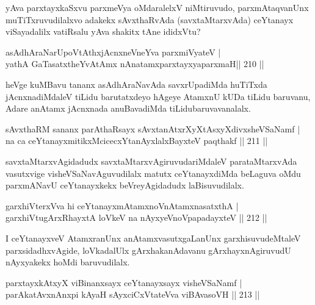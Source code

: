 \begin{artha}
yAva parxtayxkaSxvu parxmeVya oMdaralelxV niMtiruvudo, parxmAtaqvanUnx muTiTxruvudilalxvo adakekx sAvxthaRvAda (savxtaMtarxvAda) ceYtanayx viSayadalilx vatiRsalu yAva shakitx tAne ididxVtu?
\end{artha}

\begin{shl}
asAdhAraNarUpoVtAthxjAcnxneVneYva parxmiVyateV | \\
yathA GaTasatxtheYvA\s \s tAmx nAnatamxparxtayxyaparxmaH\hfill ||  210 ||  
\end{shl}

\begin{artha}
heVge kuMBavu tananx asAdhAraNavAda savxrUpadiMda huTiTxda jAcnxnadiMdaleV tiLidu barutatxdeyo hAgeye AtamxnU kUDa tiLidu baruvanu, Adare anAtamx jAcnxnada anuBavadiMda tiLidubaruvavanalalx.
\end{artha}

\begin{shl}
sAvxthaRM sananx parAthaRsayx sAvxtanAtxrXyXtAsxyXdivxsheVSaNamf | \\
na ca ceYtanayxmitikxMcicecxYtanAyxlalxBayxteV paqthakf \hfill ||  211 ||  
\end{shl}

\begin{artha}
savxtaMtarxvAgidadudx savxtaMtarxvAgiruvudariMdaleV parataMtarxvAda vasutxvige visheVSaNavAguvudilalx matutx ceYtanayxdiMda beLaguva oMdu parxmANavU ceYtanayxkekx beVreyAgidadudx laBisuvudilalx.
\end{artha}

\begin{shl}
garxhiVterxVva hi ceYtanayxmAtamxnoV\s nAtamxnasatxthA | \\
garxhiVtugArxRhayxtA loVkeV na nAyxyeVnoVpapadayxteV \hfill ||  212 ||  
\end{shl}

\begin{artha}
I ceYtanayxveV AtamxranUnx anAtamxvasutxgaLanUnx garxhisuvudeMtaleV parxsidadhxvAgide, loVkadalUlx gArxhakanAdavanu gArxhayxnAgiruvudU nAyxyakekx hoMdi baruvudilalx.
\end{artha}

\begin{shl}
parxtayxkAtxyX viBinanxsayx ceYtanayxsayx visheVSaNamf | \\
parAkatAvxnAnxpi kAyaH sAyxciCxVtateVva viBAvasoVH \hfill ||  213 ||  
\end{shl}

